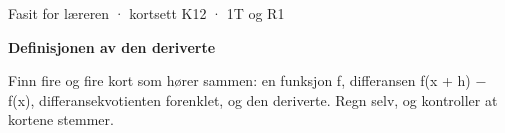 \documentclass[11pt,a4paper]{article}
\begin{document}
\begin{minipage}[t]{0.8\linewidth}\vspace{0pt}
{\sffamily\small\color{dempet}Fasit for læreren · kortsett K12 · 1T og R1}\par\vspace{0.25em}
{\fontsize{20}{24}\selectfont\bfseries Definisjonen av den deriverte}\par\vspace{0.5em}
Finn fire og fire kort som hører sammen: en funksjon f, differansen f(x + h) − f(x), differansekvotienten forenklet, og den deriverte. Regn selv, og kontroller at kortene stemmer.\par{}
\end{minipage}\hfill
\begin{minipage}[t]{0.15\linewidth}\vspace{0pt}\raggedleft
{}
\end{minipage}\par\vspace{0.8em}
\end{document}
